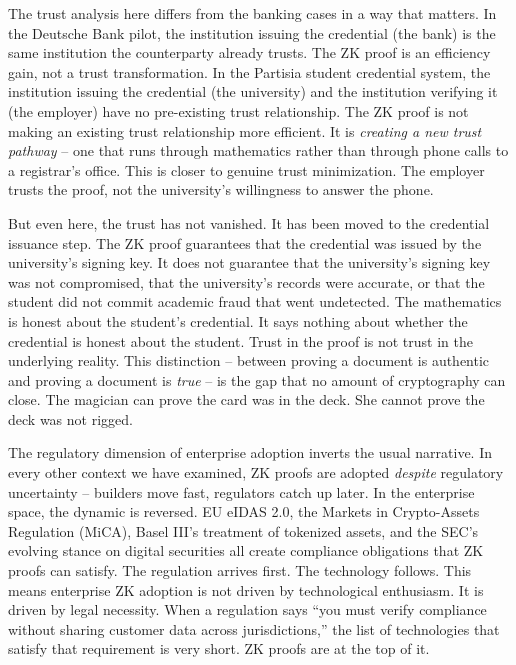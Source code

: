 \documentclass[
  11pt,
  openany]{report}
\begin{document}
The trust analysis here differs from the banking cases in a way that matters. In
the Deutsche Bank pilot, the institution issuing the credential (the bank) is
the same institution the counterparty already trusts. The ZK proof is an
efficiency gain, not a trust transformation. In the Partisia student credential
system, the institution issuing the credential (the university) and the
institution verifying it (the employer) have no pre-existing trust relationship.
The ZK proof is not making an existing trust relationship more efficient. It is
\emph{creating a new trust pathway} -- one that runs through mathematics rather
than through phone calls to a registrar's office. This is closer to genuine
trust minimization. The employer trusts the proof, not the university's
willingness to answer the phone.

But even here, the trust has not vanished. It has been moved to the credential
issuance step. The ZK proof guarantees that the credential was issued by the
university's signing key. It does not guarantee that the university's signing
key was not compromised, that the university's records were accurate, or that
the student did not commit academic fraud that went undetected. The mathematics
is honest about the student's credential. It says nothing about whether the
credential is honest about the student. Trust in the proof is not trust in the
underlying reality. This distinction -- between proving a document is authentic
and proving a document is \emph{true} -- is the gap that no amount of
cryptography can close. The magician can prove the card was in the deck. She
cannot prove the deck was not rigged.

The regulatory dimension of enterprise adoption inverts the usual narrative. In
every other context we have examined, ZK proofs are adopted \emph{despite}
regulatory uncertainty -- builders move fast, regulators catch up later. In the
enterprise space, the dynamic is reversed. EU eIDAS 2.0, the Markets in
Crypto-Assets Regulation (MiCA), Basel III's treatment of tokenized assets, and
the SEC's evolving stance on digital securities all create compliance
obligations that ZK proofs can satisfy. The regulation arrives first. The
technology follows. This means enterprise ZK adoption is not driven by
technological enthusiasm. It is driven by legal necessity. When a regulation
says ``you must verify compliance without sharing customer data across
jurisdictions,'' the list of technologies that satisfy that requirement is very
short. ZK proofs are at the top of it.
\end{document}
